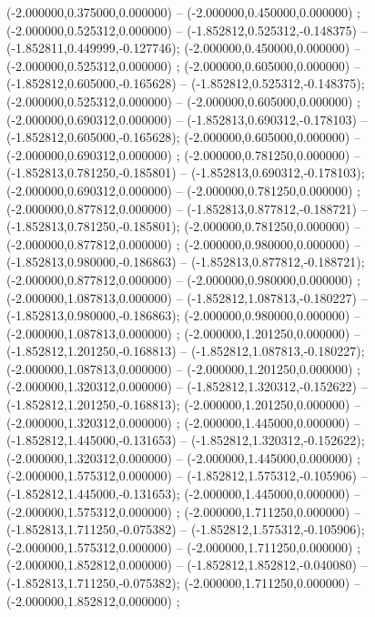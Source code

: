  (-2.000000,0.375000,0.000000) -- (-2.000000,0.450000,0.000000) ;
 (-2.000000,0.525312,0.000000) -- (-1.852812,0.525312,-0.148375) -- (-1.852811,0.449999,-0.127746);
 (-2.000000,0.450000,0.000000) -- (-2.000000,0.525312,0.000000) ;
 (-2.000000,0.605000,0.000000) -- (-1.852812,0.605000,-0.165628) -- (-1.852812,0.525312,-0.148375);
 (-2.000000,0.525312,0.000000) -- (-2.000000,0.605000,0.000000) ;
 (-2.000000,0.690312,0.000000) -- (-1.852813,0.690312,-0.178103) -- (-1.852812,0.605000,-0.165628);
 (-2.000000,0.605000,0.000000) -- (-2.000000,0.690312,0.000000) ;
 (-2.000000,0.781250,0.000000) -- (-1.852813,0.781250,-0.185801) -- (-1.852813,0.690312,-0.178103);
 (-2.000000,0.690312,0.000000) -- (-2.000000,0.781250,0.000000) ;
 (-2.000000,0.877812,0.000000) -- (-1.852813,0.877812,-0.188721) -- (-1.852813,0.781250,-0.185801);
 (-2.000000,0.781250,0.000000) -- (-2.000000,0.877812,0.000000) ;
 (-2.000000,0.980000,0.000000) -- (-1.852813,0.980000,-0.186863) -- (-1.852813,0.877812,-0.188721);
 (-2.000000,0.877812,0.000000) -- (-2.000000,0.980000,0.000000) ;
 (-2.000000,1.087813,0.000000) -- (-1.852812,1.087813,-0.180227) -- (-1.852813,0.980000,-0.186863);
 (-2.000000,0.980000,0.000000) -- (-2.000000,1.087813,0.000000) ;
 (-2.000000,1.201250,0.000000) -- (-1.852812,1.201250,-0.168813) -- (-1.852812,1.087813,-0.180227);
 (-2.000000,1.087813,0.000000) -- (-2.000000,1.201250,0.000000) ;
 (-2.000000,1.320312,0.000000) -- (-1.852812,1.320312,-0.152622) -- (-1.852812,1.201250,-0.168813);
 (-2.000000,1.201250,0.000000) -- (-2.000000,1.320312,0.000000) ;
 (-2.000000,1.445000,0.000000) -- (-1.852812,1.445000,-0.131653) -- (-1.852812,1.320312,-0.152622);
 (-2.000000,1.320312,0.000000) -- (-2.000000,1.445000,0.000000) ;
 (-2.000000,1.575312,0.000000) -- (-1.852812,1.575312,-0.105906) -- (-1.852812,1.445000,-0.131653);
 (-2.000000,1.445000,0.000000) -- (-2.000000,1.575312,0.000000) ;
 (-2.000000,1.711250,0.000000) -- (-1.852813,1.711250,-0.075382) -- (-1.852812,1.575312,-0.105906);
 (-2.000000,1.575312,0.000000) -- (-2.000000,1.711250,0.000000) ;
 (-2.000000,1.852812,0.000000) -- (-1.852812,1.852812,-0.040080) -- (-1.852813,1.711250,-0.075382);
 (-2.000000,1.711250,0.000000) -- (-2.000000,1.852812,0.000000) ;
